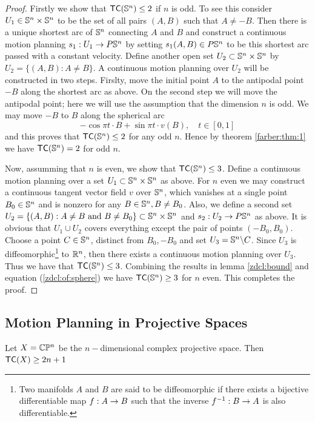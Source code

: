 \begin{proof}
    Firstly we show that $\textsf{TC}(\mathbb{S}^n) \le 2$ if $n$ is odd. 
    To see this consider $U_1 \in \mathbb{S}^n \times \mathbb{S}^n$ to be the set of all pairs $(A,B)$ such that $A \neq -B$. 
    Then there is a unique shortest arc of $\mathbb{S}^n$ connecting $A$ and $B$ and construct a continuous motion planning $s_1: U_1 \rightarrow P\mathbb{S}^n$ by setting $s_1(A,B) \in P\mathbb{S}^n$ to be this shortest arc passed with a constant velocity. Define another open set $U_2 \subset \mathbb{S}^n \times \mathbb{S}^n$ by $U_2 = \{(A,B) : A \neq B\}$. 
    A continuous motion planning over $U_2$ will be constructed in two steps. 
    Firslty, move the initial point $A$ to the antipodal point $-B$ along the shortest arc as above. 
    On the second step we will move the antipodal point; here we will use the assumption that
    the dimension $n$ is odd. 
    We may move $-B$ to $B$ along the spherical arc
    \[
        - \cos \pi t \cdot B + \sin \pi t \cdot v(B), \quad t \in [0,1]
    \]
    and this proves that $\textsf{TC}(\mathbb{S}^n) \le 2$ for any odd $n$. Hence by theorem \ref{farber:thm:1} we have $\textsf{TC}(\mathbb{S}^n) = 2$ for odd $n$.

    Now, assumming that $n$ is even, we show that $\textsf{TC}(\mathbb{S}^n) \le 3$. 
    Define a continuous motion planning over a set $U_1 \subset \mathbb{S}^n \times \mathbb{S}^n$ as above. 
    For $n$ even we may construct a continuous tangent vector field $v$ over $\mathbb{S}^n$, which vanishes at a single point $B_0 \in \mathbb{S}^n$ and is nonzero for any $B \in \mathbb{S}^n, B \neq B_0$. 
    Also, we define a second set $U_2 = \{(A,B) : A \neq B \text{ and } B \neq B_0\} \subset \mathbb{S}^n \times \mathbb{S}^n$ and $s_2 : U_2 \rightarrow P\mathbb{S}^n$ as above. 
    It is obvious that $U_1 \cup U_2$ covers everything except the pair of points $(-B_0, B_0)$. 
    Choose a point $C \in \mathbb{S}^n$, distinct from $B_0, -B_0$ and set $U_3 = \mathbb{S}^n \backslash C$.
    Since $U_3$ is diffeomorphic\footnote{Two manifolds $A$ and $B$ are said to be diffeomorphic if there exists a bijective differentiable map $f: A \rightarrow B$ such that the inverse $f^{-1} : B \rightarrow A$ is also differentiable.} to $\mathbb{R}^n$, then there exists a continuous motion planning over $U_3$. 
    Thus we have that $\textsf{TC}(\mathbb{S}^n) \le 3$. 
    Combining the results in lemma \ref{zdcl:bound} and equation (\ref{zdcl:of:sphere}) we have $\textsf{TC}(\mathbb{S}^n) \ge 3$ for $n$ even. 
    This completes the proof.
\end{proof}

\subsection{Motion Planning in Projective Spaces }
\begin{thm}
    Let $X = \mathbb{C}\mathbb{P}^n$ be the $n-$dimensional complex projective space. Then $\textsf{TC}(X) \ge 2n + 1$
\end{thm}

